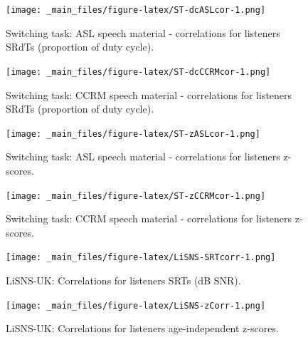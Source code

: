 \documentclass[a4paper, twoside]{templates/ociamthesis}
\newcommand*{\bibtitle}{References}
\begin{document}
\begin{figure}
\centering
\texttt{[image: \_main\_files/figure-latex/ST-dcASLcor-1.png]}
\caption{\label{fig:ST-dcASLcor} Switching task: ASL speech material - correlations for listeners SRdTs (proportion of duty cycle).}
\end{figure}

\begin{figure}
\centering
\texttt{[image: \_main\_files/figure-latex/ST-dcCCRMcor-1.png]}
\caption{\label{fig:ST-dcCCRMcor} Switching task: CCRM speech material - correlations for listeners SRdTs (proportion of duty cycle).}
\end{figure}

\begin{figure}
\centering
\texttt{[image: \_main\_files/figure-latex/ST-zASLcor-1.png]}
\caption{\label{fig:ST-zASLcor} Switching task: ASL speech material - correlations for listeners z-scores.}
\end{figure}

\begin{figure}
\centering
\texttt{[image: \_main\_files/figure-latex/ST-zCCRMcor-1.png]}
\caption{\label{fig:ST-zCCRMcor} Switching task: CCRM speech material - correlations for listeners z-scores.}
\end{figure}

\begin{figure}
\centering
\texttt{[image: \_main\_files/figure-latex/LiSNS-SRTcorr-1.png]}
\caption{\label{fig:LiSNS-SRTcorr} LiSNS-UK: Correlations for listeners SRTs (dB SNR).}
\end{figure}

\begin{figure}
\centering
\texttt{[image: \_main\_files/figure-latex/LiSNS-zCorr-1.png]}
\caption{\label{fig:LiSNS-zcorr} LiSNS-UK: Correlations for listeners age-independent z-scores.}
\end{figure}




\setlength{\baselineskip}{0pt} %

{\renewcommand*\MakeUppercase[1]{#1}%
\printbibliography[heading=bibintoc,title={\bibtitle}]}
\end{document}

